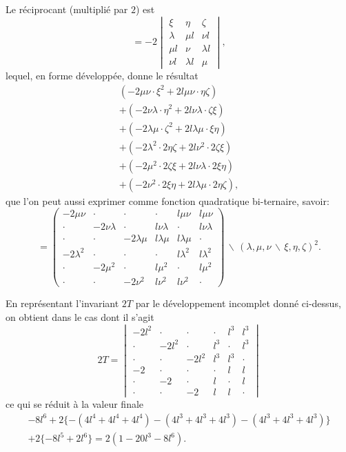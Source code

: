 \documentclass[11pt,a4paper]{book}
\begin{document}
\newpage

Le r\'{e}ciprocant (multipli\'{e} par $2$) est
\[=-2\begin{vmatrix}\xi & \eta & \zeta \\ \lambda & \mu l & \nu l \\ \mu l & \nu & \lambda l \\ \nu l & \lambda l & \mu\end{vmatrix},\]
lequel, en forme d\'{e}velopp\'{e}e, donne le r\'{e}sultat
\begin{multline*}
(-2\mu\nu \cdot \xi^{2} + 2l\mu\nu \cdot \eta\zeta) \\
+ (-2\nu\lambda \cdot \eta^{2} + 2l\nu\lambda \cdot \zeta\xi) \\
+ (-2\lambda\mu \cdot \zeta^{2} + 2l\lambda\mu \cdot \xi\eta) \\
+ (-2\lambda^{2} \cdot 2\eta\zeta + 2l\nu^{2} \cdot 2\zeta\xi) \\
+ (-2\mu^{2} \cdot 2\zeta\xi + 2l\nu\lambda \cdot 2\xi\eta) \\
+ (-2\nu^{2} \cdot 2\xi\eta + 2l\lambda\mu \cdot 2\eta\zeta),
\end{multline*}
que l'on peut aussi exprimer comme fonction quadratique bi-ternaire, savoir:
\[
= \begin{pmatrix}
-2\mu\nu & \cdot & \cdot & \cdot & l\mu\nu & l\mu\nu \\
\cdot & -2\nu\lambda & \cdot & l\nu\lambda & \cdot & l\nu\lambda \\
\cdot & \cdot & -2\lambda\mu & l\lambda\mu & l\lambda\mu & \cdot \\
-2\lambda^{2} & \cdot & \cdot & \cdot & l\lambda^{2} & l\lambda^{2} \\
\cdot & -2\mu^{2} & \cdot & l\mu^{2} & \cdot & l\mu^{2} \\
\cdot & \cdot & -2\nu^{2} & l\nu^{2} & l\nu^{2} & \cdot
\end{pmatrix}\!\!\,\backslash\!\!\,(\lambda,\mu,\nu\,\backslash\!\!\,\xi,\eta,\zeta)^{2}.
\]

En repr\'{e}sentant l'invariant $2T$ par le d\'{e}veloppement incomplet donn\'{e} ci-dessus,
on obtient dans le cas dont il s'agit
\[
2T = \begin{vmatrix}
-2l^{2} & \cdot & \cdot & \cdot & l^{3} & l^{3} \\
\cdot & -2l^{2} & \cdot & l^{3} & \cdot & l^{3} \\
\cdot & \cdot & -2l^{2} & l^{3} & l^{3} & \cdot \\
-2 & \cdot & \cdot & \cdot & l & l \\
\cdot & -2 & \cdot & l & \cdot & l \\
\cdot & \cdot & -2 & l & l & \cdot
\end{vmatrix}
\]
ce qui se r\'{e}duit \`{a} la valeur finale
\begin{multline*}
-8l^{6} + 2\{-(4l^{4}+4l^{4}+4l^{4})-(4l^{3}+4l^{3}+4l^{3})
-(4l^{3}+4l^{3}+4l^{3})\} \\
+ 2\{-8l^{5}+2l^{6}\} = 2(1 - 20l^{3} - 8l^{6}).
\end{multline*}
\end{document}
